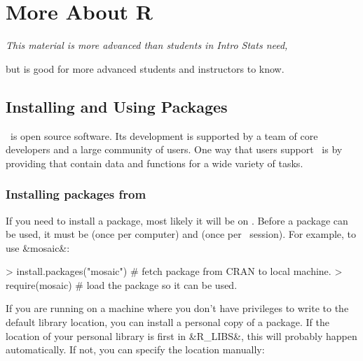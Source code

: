\chapter{More About R}




\begin{center}
\it
This material is more advanced than students in Intro Stats need, 

\vspace{-4mm}

but is good for more advanced students and instructors to know.
\end{center}

\DefineShortVerb{\&}

\section{Installing and Using Packages}

\R\ is open source software.  Its development is supported by
a team of core developers and a large community of users.
One way that users support
\R\ is by providing  that contain data and functions
for a wide variety of tasks.  

\subsection{Installing packages from \cran}
If you need to install a package, most likely it will be on \cran.
Before a package can be used, it must be  
(once per computer) and 
 (once per \R\ session).  For example, to use &mosaic&:
%
%

\begin{Schunk}
\begin{Sinput}
> install.packages("mosaic")   # fetch package from CRAN to local machine.
> require(mosaic)              # load the package so it can be used.
\end{Sinput}
\end{Schunk}

If you are running on a machine where you don't have privileges to
write to the default library location, you can install a personal 
copy of a package.  If the location of your personal library is 
first in &R_LIBS&, this will probably happen automatically.  If not,
you can specify the location manually:

